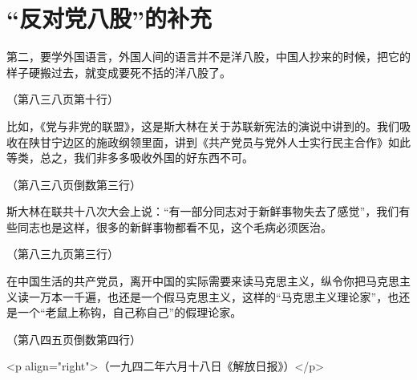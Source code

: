 \section[ “反对党八股”的补充（一九四二年二月八日）]{ “反对党八股”的补充}


第二，要学外国语言，外国人间的语言并不是洋八股，中国人抄来的时候，把它的样子硬搬过去，就变成要死不括的洋八股了。

（第八三八页第十行）

比如，《党与非党的联盟》，这是斯大林在关于苏联新宪法的演说中讲到的。我们吸收在陕甘宁边区的施政纲领里面，讲到《共产党员与党外人士实行民主合作》如此等类，总之，我们非多多吸收外国的好东西不可。

（第八三八页倒数第三行）

斯大林在联共十八次大会上说：“有一部分同志对于新鲜事物失去了感觉”，我们有些同志也是这样，很多的新鲜事物都看不见，这个毛病必须医治。

（第八三九页第三行）

在中国生活的共产党员，离开中国的实际需要来读马克思主义，纵令你把马克思主义读一万本一千遍，也还是一个假马克思主义，这样的“马克思主义理论家”，也还是一个“老鼠上称钩，自己称自己”的假理论家。

（第八四五页倒数第四行）

<p align="right">（一九四二年六月十八日《解放日报》）</p>

